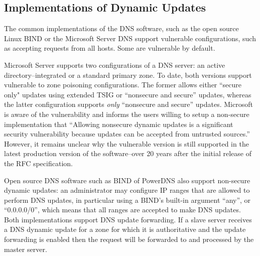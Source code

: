\subsection{Implementations of Dynamic Updates}

The common implementations of the DNS software, such as the open source Linux BIND \cite{bind} or the Microsoft Server DNS support vulnerable configurations, such as accepting requests from all hosts.
Some are vulnerable by default.

Microsoft Server supports two configurations of a DNS server: an active directory--integrated or a standard primary zone.
To date, both versions support vulnerable to zone poisoning configurations.
The former allows either ``secure only" updates using extended TSIG or ``nonsecure and secure'' updates, whereas the latter configuration supports \textit{only} ``nonsecure and secure''  updates.
Microsoft is aware of the vulnerability and informs the users willing to setup a non-secure implementation that ``Allowing nonsecure dynamic updates is a significant security vulnerability because updates can be accepted from untrusted sources.''
However, it remains unclear why the vulnerable version is still supported in the latest production version of the software--over 20 years after the initial release of the RFC specification.

Open source DNS software such as BIND of PowerDNS also support non-secure dynamic updates: an administrator may configure IP ranges that are allowed to perform DNS updates, in particular  using a BIND's built-in argument ``any'', or ``0.0.0.0/0'', which means that all ranges are accepted to make DNS updates. 
Both implementations support DNS update forwarding.  
If a slave server receives a DNS dynamic update for a zone for which it is authoritative and the update forwarding is enabled then the request will be forwarded to and processed by the master server.

